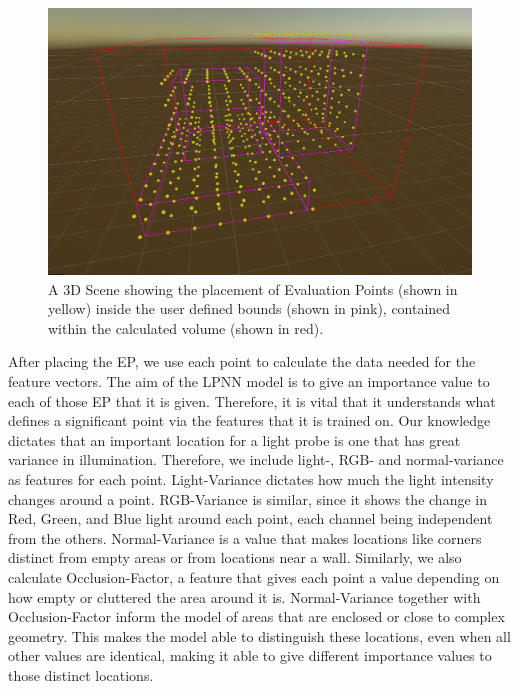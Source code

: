 \begin{figure}[h]
	\centering
	\includegraphics[width=\linewidth]{Graphics/Grid_Example.jpg}
	\caption{A 3D Scene showing the placement of Evaluation Points (shown in yellow) inside the user defined bounds (shown in pink), contained within the calculated volume (shown in red).}
	\label{fig:grid}
\end{figure}

After placing the EP, we use each point to calculate the data needed for the feature vectors. The aim of the LPNN model is to give an importance value to each of those EP that it is given. Therefore, it is vital that it understands what defines a significant point via the features that it is trained on. Our knowledge dictates that an important location for a light probe is one that has great variance in illumination. Therefore, we include light-, RGB- and normal-variance as features for each point. Light-Variance dictates how much the light intensity changes around a point. RGB-Variance is similar, since it shows the change in Red, Green, and Blue light around each point, each channel being independent from the others. Normal-Variance is a value that makes locations like corners distinct from empty areas or from locations near a wall. Similarly, we also calculate Occlusion-Factor, a feature that gives each point a value depending on how empty or cluttered the area around it is. Normal-Variance together with Occlusion-Factor inform the model of areas that are enclosed or close to complex geometry. This makes the model able to distinguish these locations, even when all other values are identical, making it able to give different importance values to those distinct locations.\newline

